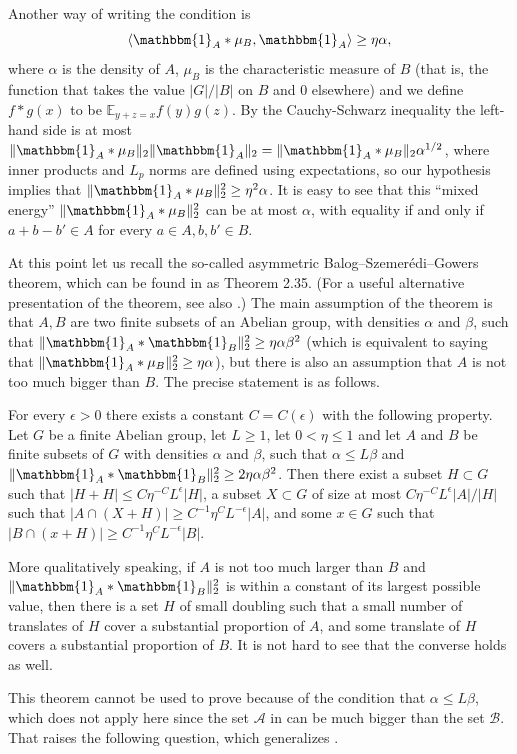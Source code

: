\documentclass{toc}
\newcommand\eps{\epsilon}  %
\newcommand\E{\mathbb{E}}
\renewcommand\a{\alpha}
\newcommand\be{\beta}
\newcommand{\ind}{\mathbbm{1}}
\renewcommand\AA{\ind_A}
\newcommand\BB{\ind_B}
\newcommand \cA{\mathcal A}
\newcommand \cB{\mathcal B}
\begin{document}
Another way of writing the condition is
\[\langle \AA*\mu_B,\AA\rangle\geq\eta\a,\]
where $\a$ is the density of $A$, $\mu_B$ is the characteristic measure of $B$ (that is, the function that takes the value $|G|/|B|$ on $B$ and 0 elsewhere) and we define $f*g(x)$ to be $\E_{y+z=x}f(y)g(z)$. By the Cauchy-Schwarz inequality the left-hand side is at most $\|\AA*\mu_B\|_2\|\AA\|_2=\|\AA*\mu_B\|_2\a^{1/2}$, where inner products and $L_p$ norms are defined using expectations, so our hypothesis implies that $\|\AA*\mu_B\|_2^2\geq\eta^2\a$. It is easy to see that this ``mixed energy'' $\|\AA*\mu_B\|_2^2$ can be at most $\a$, with equality if and only if $a+b-b'\in A$ for every $a\in A, b,b'\in B$. 

At this point let us recall the so-called asymmetric Balog--Szemer\'edi--Gowers theorem, which can be found in \cite{taovu} as Theorem 2.35. (For a useful alternative presentation of the theorem, see also \cite{greenBSG}.) The main assumption of the theorem is that $A,B$ are two finite subsets of an Abelian group, with densities $\a$ and $\be$, such that $\|\AA*\BB\|_2^2\geq\eta\a\be^2$ (which is equivalent to saying that $\|\AA*\mu_B\|_2^2\geq\eta\a$), but there is also an assumption that $A$ is not too much bigger than $B$. The precise statement is as follows.

\begin{theorem} \label{asym}
	For every $\eps>0$ there exists a constant $C=C(\eps)$ with the following property. Let $G$ be a finite Abelian group, let $L\geq 1$, let $0<\eta\leq 1$ and let $A$ and $B$ be finite subsets of $G$ with densities $\a$ and $\be$, such that $\a\leq L\be$ and $\|\AA*\BB\|_2^2\geq 2\eta\a\be^2$. Then there exist a subset $H\subset G$ such that $|H+H|\leq C\eta^{-C}L^\eps|H|$, a subset $X\subset G$ of size at most $C\eta^{-C}L^\eps|A|/|H|$ such that $|A\cap(X+H)|\geq C^{-1}\eta^CL^{-\eps}|A|$, and some $x\in G$ such that $|B\cap(x+H)|\geq C^{-1}\eta^CL^{-\eps}|B|$.
\end{theorem}

\noindent More qualitatively speaking, if $A$ is not too much larger than $B$ and $\|\AA*\BB\|_2^2$ is within a constant of its largest possible value, then there is a set $H$ of small doubling such that a small number of translates of $H$ cover a substantial proportion of $A$, and some translate of $H$ covers a substantial proportion of $B$. It is not hard to see that the converse holds as well.

This theorem cannot be used to prove  because of the condition that $\a\leq L\be$, which does not apply here since the set $\cA$ in  can be much bigger than the set $\cB$. That raises the following question, which generalizes .
\end{document}
